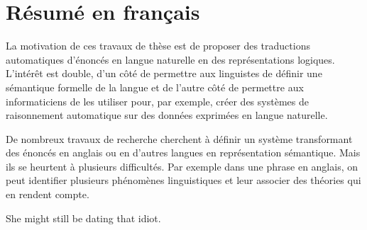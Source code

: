 \chapter*{Résumé en français}
\label{chap:french-summary}

La motivation de ces travaux de thèse est de proposer des traductions
automatiques d'énoncés en langue naturelle en des représentations logiques. 
L'intérêt est double, d'un côté de permettre aux linguistes de définir une sémantique
formelle de la langue et de l'autre côté de permettre aux informaticiens de les 
utiliser pour, par exemple, créer des systèmes de raisonnement automatique sur des données 
exprimées en langue naturelle.

De nombreux travaux de recherche cherchent à définir un système transformant 
des énoncés en anglais ou en d'autres langues en représentation sémantique. Mais ils se heurtent à plusieurs difficultés.
Par exemple dans une phrase en anglais, on peut identifier plusieurs phénomènes 
linguistiques et leur associer des théories qui en rendent compte.

\begin{exe}
   She might still be dating that idiot.
\end{exe}

